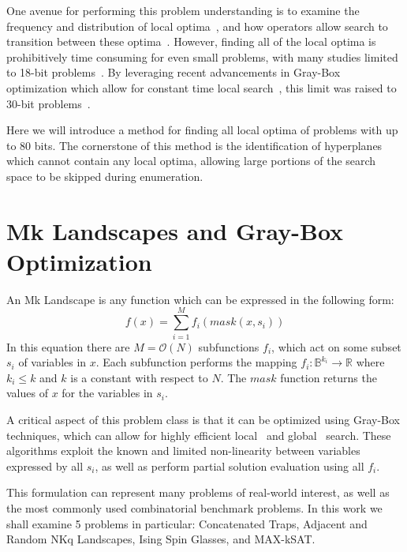 \documentclass[runningheads,a4paper]{llncs}
\newcommand{\BigO}[1]{$\mathcal{O}{(#1)}$}
\begin{document}
One avenue for performing this problem understanding is to
examine the frequency and distribution of local optima~\cite{boese:1994:bigvalley},
and how operators allow search to transition between these
optima~\cite{tomassini:2008:nknetworks,verel:2011:nknetworks,ochoa:2015:crossovernetworks}.
However, finding all of the local optima is prohibitively time consuming
for even small problems, with many studies limited to 18-bit
problems~\cite{tomassini:2008:nknetworks,verel:2011:nknetworks}.
By leveraging recent advancements in Gray-Box optimization which allow for
constant time local search~\cite{chicano:2014:ball}, this limit was raised
to 30-bit problems~\cite{ochoa:2015:crossovernetworks}.

Here we will introduce a method for finding all local optima of problems
with up to 80 bits. The cornerstone of this method is the identification
of hyperplanes which cannot contain any local optima, allowing large
portions of the search space to be skipped during enumeration.



\section{Mk Landscapes and Gray-Box Optimization}
An Mk Landscape is any function which can be expressed in the following form:
\begin{equation}
  f(x) = \sum_{i=1}^{M} f_i(mask(x, s_i))
  \label{eq-mk}
\end{equation}
In this equation there are $M=$\BigO{N} subfunctions $f_i$, which act
on some subset $s_i$ of variables in $x$. Each subfunction performs the mapping
$f_i : \mathbb{B}^{k_i}\rightarrow \mathbb{R}$ where $k_i \leq k$ and $k$ is
a constant with respect to $N$. The $mask$ function returns the values of $x$ for
the variables in $s_i$.

A critical aspect of this problem class is that it can be optimized using Gray-Box
techniques, which can allow for highly efficient local~\cite{whitley:2012:constant}
and global~\cite{goldman:2015:GBO,tintos:2015:partitioncross} search. These algorithms
exploit the known and limited non-linearity between variables expressed by all $s_i$,
as well as perform partial solution evaluation using all $f_i$.

This formulation can represent many problems of real-world interest, as well as
the most commonly used combinatorial benchmark problems. In this work we shall
examine 5 problems in particular: Concatenated Traps, Adjacent and Random NKq Landscapes,
Ising Spin Glasses, and MAX-kSAT.
\end{document}
